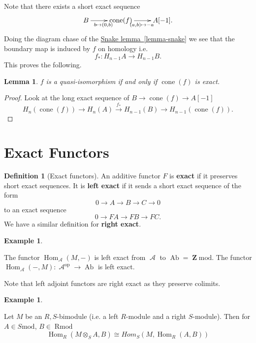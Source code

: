 \documentclass[10pt,]{book}
\newcommand{\terminology}[1]{\textbf{#1}}
\theoremstyle{plain}
\newtheorem{lemma}[theorem]{Lemma}
\theoremstyle{definition}
\newtheorem{definition}[theorem]{Definition}
\newtheorem{example}[theorem]{Example}
\numberwithin{equation}{section}
\DeclareMathOperator{\Hom}{Hom}
\DeclareMathOperator{\op}{op}
\DeclareMathOperator{\cone}{cone}
\DeclareMathOperator{\Ab}{\text{Ab}}
\DeclareMathOperator{\ZZ}{\mathbf{Z}}
\DeclareMathOperator{\Rmod}{R\text{mod}}
\DeclareMathOperator{\cA}{\mathcal{A}}
\begin{document}
          Note that there exists a short exact sequence
          \[
            \xymatrix{B \ar[r]_{b\mapsto (0,b)}& \cone(f) \ar[r]_{(a,b)\mapsto -a}& A[-1].}
          \]
          Doing the diagram chase of the \hyperref[lemma-snake]{Snake lemma~\ref*{lemma-snake}} we see that the boundary map is induced by \(f\) on homology i.e. \[f_*\colon H_{n-1}A \to H_{n-1}B.\]
          This proves the following.
\begin{lemma}\label{lemma-3}
\(f\) is a quasi-isomorphism if and only if \(\cone(f)\) is exact.\end{lemma}
\begin{proof}

            Look at the long exact sequence of \(B \to \cone(f) \to A[-1]\)\[
              H_{n}(\cone(f)) \to H_n(A) \xrightarrow{f_*} H_{n-1}(B) \to H_{n-1}(\cone(f)).
            \]\end{proof}
\typeout{************************************************}
\typeout{************************************************}
\section[Exact Functors]{Exact Functors}\label{sec-exact}
\begin{definition}[Exact functors]\label{definition-16}
An additive functor \(F\) is \terminology{exact} if it preserves short exact sequences.
            It is \terminology{left exact} if it sends a short exact sequence of the form
            \[
              0\to A \to B \to C \to 0
            \]
            to an exact sequence
            \[
              0 \to FA \to FB \to FC.
            \]
            We have a similar definition for \terminology{right exact}.
          \end{definition}
\begin{example}\label{example-7}

            The functor \(\Hom_{\cA}(M, -)\) is left exact from \(\cA\) to \(\Ab = \ZZ\text{mod}\).
            The functor \(\Hom_{\cA}( -, M)\colon \cA^{\op} \to\Ab\) is left exact.\newline{}\end{example}

          Note that left adjoint functors are right exact as they preserve colimits.
\begin{example}\label{example-8}

            Let \(M\) be an \(R,S\)-bimodule (i.e. a left \(R\)-module and a right \(S\)-module).
            Then for \(A \in S\text{mod}\), \(B\in \Rmod\)\[
              \Hom_{R}(M \otimes_S A, B) \cong Hom_{S}(M, \Hom_R(A,B))
            \]\end{example}
\par
\end{document}
